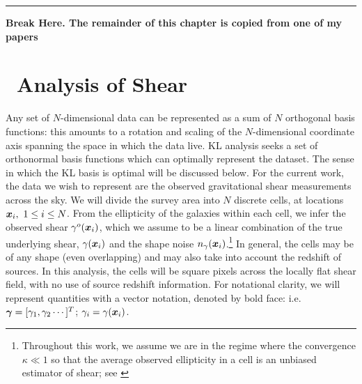 \rule{0.8\textwidth}{0.5pt}

{\bf Break Here.  The remainder of this chapter is copied from one of
  my papers}

\section{\KL\ Analysis of Shear}
\label{KL_Intro}
Any set of $N$-dimensional data can be represented as a sum of 
$N$ orthogonal basis functions: this amounts to a rotation and scaling of 
the $N$-dimensional coordinate axis spanning the space in which the data live.
KL analysis seeks a set of orthonormal basis functions which can optimally
represent the dataset.  The sense in which the KL basis is optimal will be
discussed below.  For the current work, the data we wish to represent are the 
observed gravitational shear measurements across the sky.  
We will divide the survey 
area into $N$ discrete cells, at locations $\myvec{x}_i,\ 1\le i \le N$.  
From the ellipticity of the galaxies within each cell, 
we infer the observed shear $\gamma^o(\boldsymbol{x}_i)$, which we assume
to be a linear combination of the true underlying shear, $\gamma(\boldsymbol{x}_i)$
and the shape noise $n_\gamma(\boldsymbol{x}_i)$.\footnote{
Throughout this work, we assume we are in the regime where the convergence
$\kappa \ll 1$ so that the average observed ellipticity in a 
cell is an unbiased estimator of shear; see \citet{Bartelmann01}}
In general, the cells may be of any shape (even overlapping) 
and may also take into account the redshift of sources.
In this analysis, the cells will be square pixels across the locally 
flat shear field, with no use of source redshift information.  
For notational clarity, we will represent quantities with a vector notation,
denoted by bold face: i.e. $\boldsymbol{\gamma} = [\gamma_1,\gamma_2\cdots]^T$; 
$\gamma_i = \gamma(\boldsymbol{x}_i)$. 

